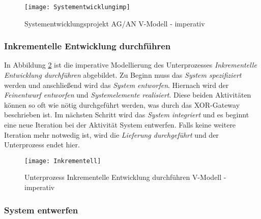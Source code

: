 \begin{figure}[!htbp]
\begin{center}
  \texttt{[image: Systementwicklungimp]} %
  \caption{Systementwicklungsprojekt AG/AN  V-Modell - imperativ}
  \label{fig:Systementwicklungimp}
\end{center}
\end{figure}




\subsubsection{Inkrementelle Entwicklung durchführen}
In Abbildung \ref{fig:Inkrementell} ist die imperative Modellierung des Unterprozesses \textit{Inkrementelle Entwicklung durchführen} abgebildet. \newline
Zu Beginn muss das \textit{System spezifiziert} werden und anschließend wird das \textit{System entworfen}. \newline
Hiernach wird der \textit{Feinentwurf entworfen} und \textit{Systemelemente realisiert}. Diese beiden Aktivitäten können so oft wie nötig durchgeführt werden, was durch das XOR-Gateway beschrieben ist.  \newline
Im nächsten Schritt wird das \textit{System integriert} und es beginnt eine neue Iteration bei der Aktivität System entwerfen.\newline
Falls keine weitere Iteration mehr notwedig ist, wird die \textit{Lieferung durchgeführt} und der Unterprozess endet hier. \newline

\begin{figure}[!htbp]
\begin{center}
  \texttt{[image: Inkrementell]} %
  \caption{Unterprozess Inkrementelle Entwicklung durchführen V-Modell - imperativ}
  \label{fig:Inkrementell}
\end{center}
\end{figure}



\clearpage


\subsubsection{System entwerfen}

